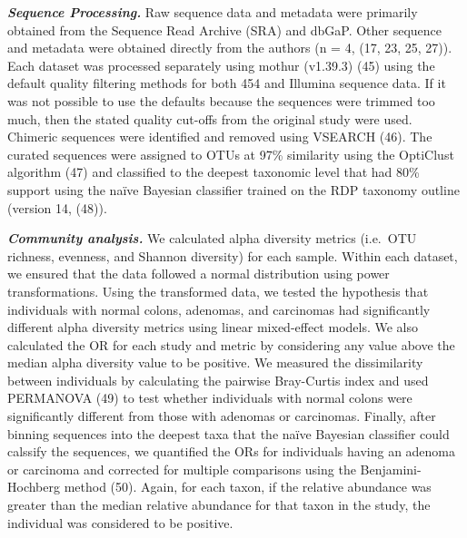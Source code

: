 \documentclass[12pt,]{article}
\begin{document}
\textbf{\emph{Sequence Processing.}} Raw sequence data and metadata were
primarily obtained from the Sequence Read Archive (SRA) and dbGaP. Other
sequence and metadata were obtained directly from the authors (n = 4,
(17, 23, 25, 27)). Each dataset was processed separately using mothur
(v1.39.3) (45) using the default quality filtering methods for both 454
and Illumina sequence data. If it was not possible to use the defaults
because the sequences were trimmed too much, then the stated quality
cut-offs from the original study were used. Chimeric sequences were
identified and removed using VSEARCH (46). The curated sequences were
assigned to OTUs at 97\% similarity using the OptiClust algorithm (47)
and classified to the deepest taxonomic level that had 80\% support
using the naïve Bayesian classifier trained on the RDP taxonomy outline
(version 14, (48)).

\textbf{\emph{Community analysis.}} We calculated alpha diversity
metrics (i.e.~OTU richness, evenness, and Shannon diversity) for each
sample. Within each dataset, we ensured that the data followed a normal
distribution using power transformations. Using the transformed data, we
tested the hypothesis that individuals with normal colons, adenomas, and
carcinomas had significantly different alpha diversity metrics using
linear mixed-effect models. We also calculated the OR for each study and
metric by considering any value above the median alpha diversity value
to be positive. We measured the dissimilarity between individuals by
calculating the pairwise Bray-Curtis index and used PERMANOVA (49) to
test whether individuals with normal colons were significantly different
from those with adenomas or carcinomas. Finally, after binning sequences
into the deepest taxa that the naïve Bayesian classifier could calssify
the sequences, we quantified the ORs for individuals having an adenoma
or carcinoma and corrected for multiple comparisons using the
Benjamini-Hochberg method (50). Again, for each taxon, if the relative
abundance was greater than the median relative abundance for that taxon
in the study, the individual was considered to be positive.
\end{document}

